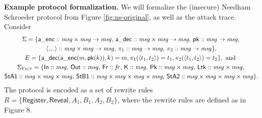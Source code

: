 \documentclass{article}
\theoremstyle{definition}
\begin{document}
\textbf{Example protocol formalization.} We will formalize the (insecure) Needham Schroeder protocol from Figure \ref{fig:ns-original}, as well as the attack trace. Consider 
\begin{gather*} 
\Sigma = \{ \mathsf{a\_enc} :: \mathit{msg} \times \mathit{msg} \rightarrow \mathit{msg},\, \mathsf{a\_dec} :: \mathit{msg} \times \mathit{msg} \rightarrow \mathit{msg},\, \mathsf{pk} :: \mathit{msg} \rightarrow \mathit{msg},\, \\ \langle ., . \rangle :: \mathit{msg} \times \mathit{msg} \rightarrow \mathit{msg},\, 
\pi_1 :: \mathit{msg} \rightarrow \mathit{msg},\, \pi_2 :: \mathit{msg} \rightarrow \mathit{msg}  \}, \\
E = \{ \mathsf{a\_dec}(\mathsf{a\_enc}(m, \mathsf{pk}(k)), k) = m, \pi_1(\langle t_1, t_2 \rangle) = t_1, \pi_2(\langle t_1, t_2 \rangle) = t_2 \}, \text{ and } \\ \Sigma_{\textsc{Fact}} = \{ \mathsf{In} :: \mathit{msg},\, \mathsf{Out} :: \mathit{msg},\, \mathsf{Fr} :: \mathit{fr},\, \mathsf{K} :: \mathit{msg},\, \mathsf{Pk} :: \mathit{msg} \times \mathit{msg},\, \mathsf{Ltk} :: \mathit{msg} \times \mathit{msg},\, \\
\mathsf{StA1} :: \mathit{msg} \times \mathit{msg} \times \mathit{msg},\, \mathsf{StB1} :: \mathit{msg} \times \mathit{msg} \times \mathit{msg} \times \mathit{msg},\, \mathsf{StA2} :: \mathit{msg} \times \mathit{msg} \times \mathit{msg} \times \mathit{msg} \}.
\end{gather*}
The protocol is encoded as a set of rewrite rules $R = \{ \mathsf{Register}, \mathsf{Reveal}, A_1, B_1, A_2, B_2 \}$, 
where the rewrite rules are defined as in Figure 8.
\end{document}
